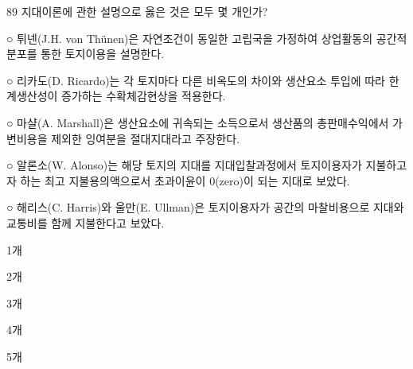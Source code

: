 \begin{question}{89}
지대이론에 관한 설명으로 옳은 것은 모두 몇 개인가?
\begin{framedtext}
○ 튀넨(J.H. von Thünen)은 자연조건이 동일한 고립국을 가정하여 상업활동의 공간적 분포를 통한 토지이용을 설명한다. \par
○ 리카도(D. Ricardo)는 각 토지마다 다른 비옥도의 차이와 생산요소 투입에 따라 한계생산성이 증가하는 수확체감현상을 적용한다. \par
○ 마샬(A. Marshall)은 생산요소에 귀속되는 소득으로서 생산품의 총판매수익에서 가변비용을 제외한 잉여분을 절대지대라고 주장한다. \par
○ 알론소(W. Alonso)는 해당 토지의 지대를 지대입찰과정에서 토지이용자가 지불하고자 하는 최고 지불용의액으로서 초과이윤이 0(zero)이 되는 지대로 보았다. \par
○ 해리스(C. Harris)와 울만(E. Ullman)은 토지이용자가 공간의 마찰비용으로 지대와 교통비를 함께 지불한다고 보았다.
\end{framedtext}
\begin{choices}
  \item 1개
  \item 2개
  \item 3개
  \item 4개
  \item 5개
\end{choices}
\end{question}
